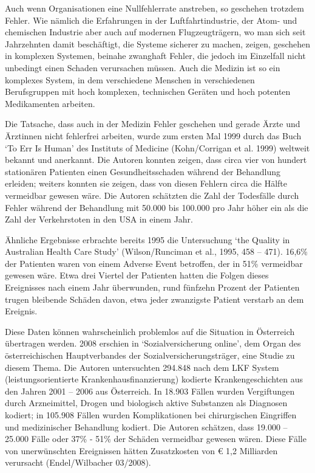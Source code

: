 Auch wenn Organisationen eine Nullfehlerrate anstreben, so
geschehen trotzdem Fehler. Wie nämlich die Erfahrungen in
der Luftfahrtindustrie, der Atom- und chemischen Industrie
aber auch auf modernen Flugzeugträgern, wo man sich seit
Jahrzehnten damit beschäftigt, die Systeme sicherer zu
machen, zeigen, geschehen in komplexen Systemen, beinahe
zwanghaft Fehler, die jedoch im Einzelfall nicht unbedingt
einen Schaden verursachen müssen. Auch die Medizin ist so
ein komplexes System, in dem verschiedene Menschen in
verschiedenen Berufsgruppen mit hoch komplexen, technischen
Geräten und hoch potenten Medikamenten arbeiten.




Die Tatsache, dass auch in der Medizin Fehler geschehen und
gerade Ärzte und Ärztinnen nicht fehlerfrei arbeiten, wurde
zum ersten Mal 1999 durch das Buch \enquote*{To Err Is Human} des
Instituts of Medicine (Kohn/Corrigan et al. 1999) weltweit
bekannt und anerkannt. Die Autoren konnten zeigen, dass
circa vier von hundert stationären Patienten einen
Gesundheitsschaden während der Behandlung erleiden; weiters
konnten sie zeigen, dass von diesen Fehlern circa die
Hälfte vermeidbar gewesen wäre. Die Autoren schätzten die
Zahl der Todesfälle durch Fehler während der Behandlung mit
50.000 bis 100.000 pro Jahr höher ein als die Zahl der
Verkehrstoten in den USA in einem Jahr.




Ähnliche Ergebnisse erbrachte bereits 1995 die Untersuchung
\enquote*{the Quality in Australian Health Care Study}
(Wilson/Runciman et al., 1995, 458 – 471). 16,6\% der
Patienten waren von einem Adverse Event betroffen, der in
51\% vermeidbar gewesen wäre. Etwa drei Viertel der
Patienten hatten die Folgen dieses Ereignisses nach einem
Jahr überwunden, rund fünfzehn Prozent der Patienten trugen
bleibende Schäden davon, etwa jeder zwanzigste Patient
verstarb an dem Ereignis.




Diese Daten können wahrscheinlich problemlos auf die
Situation in Österreich übertragen werden. 2008 erschien in
\enquote*{Sozialversicherung online}, dem Organ des österreichischen
Hauptverbandes der Sozialversicherungsträger, eine Studie
zu diesem Thema. Die Autoren untersuchten 294.848 nach dem
LKF System (leistungsorientierte Krankenhausfinanzierung)
kodierte Krankengeschichten aus den Jahren 2001 – 2006 aus
Österreich. In 18.903 Fällen wurden Vergiftungen durch
Arzneimittel, Drogen und biologisch aktive Substanzen als
Diagnosen kodiert; in 105.908 Fällen wurden Komplikationen
bei chirurgischen Eingriffen und medizinischer Behandlung
kodiert. Die Autoren schätzen, dass 19.000 – 25.000 Fälle
oder 37\% - 51\% der Schäden vermeidbar gewesen wären.
Diese Fälle von unerwünschten Ereignissen hätten
Zusatzkosten von € 1,2 Milliarden verursacht
(Endel/Wilbacher 03/2008).




